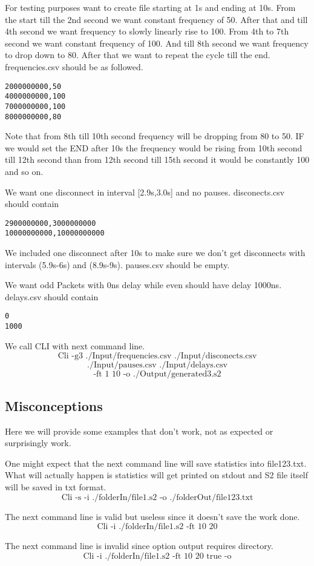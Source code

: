 \documentclass[english]{article}
\begin{document}
For testing purposes want to create file starting at 1s and ending at 10s. From the start till the 2nd second we want constant frequency of 50. After that and till 4th second we want frequency to slowly linearly rise to 100. From 4th to 7th second we want constant frequency of 100. And till 8th second we want frequency to drop down to 80. After that we want to repeat the cycle till the end. frequencies.csv should be as followed.
\begin{verbatim}
2000000000,50
4000000000,100
7000000000,100
8000000000,80
\end{verbatim}
Note that from 8th till 10th second frequency will be dropping from 80 to 50. IF we would set the END after 10s the frequency would be rising from 10th second till 12th second than from 12th second till 15th second it would be constantly 100 and so on.

We want one disconnect in interval [2.9s,3.0s] and no pauses. 
disconects.csv should contain
\begin{verbatim}
2900000000,3000000000
10000000000,10000000000
\end{verbatim}
We included one disconnect after 10s to make sure we don't get disconnects with intervals (5.9s-6s) and (8.9s-9s).
pauses.csv should be empty.

We want odd Packets with 0ns delay while even should have delay 1000ns.
delays.csv should contain
\begin{verbatim}
0
1000
\end{verbatim}
We call CLI with next command line.
$$\text{Cli -g3 ./Input/frequencies.csv ./Input/disconects.csv}$$
$$\text{./Input/pauses.csv ./Input/delays.csv}$$
$$\text{-ft 1 10 -o ./Output/generated3.s2} $$

\subsection{Misconceptions}
Here we will provide some examples that don't work, not as expected or surprisingly work.

One might expect that the next command line will save statistics into file123.txt. What will actually happen is statistics will get printed on stdout and S2 file itself will be saved in txt format.
$$\text{Cli -s -i ./folderIn/file1.s2 -o ./folderOut/file123.txt}$$

The next command line is valid but useless since it doesn't save the work done.
$$\text{Cli -i ./folderIn/file1.s2 -ft 10 20}$$

The next command line is invalid since option output requires directory.
$$\text{Cli -i ./folderIn/file1.s2 -ft 10 20 true -o}$$
\end{document}
